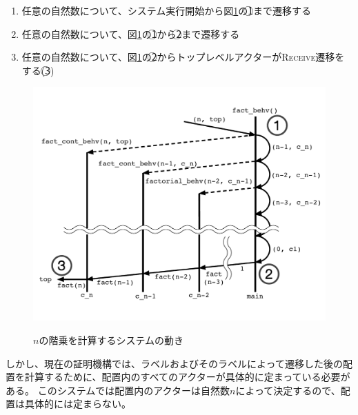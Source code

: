 
\begin{enumerate}
\item 任意の自然数について、システム実行開始から図\ref{img:conclusion:fact}の\textcircled{\scriptsize 1}まで遷移する
\item 任意の自然数について、図\ref{img:conclusion:fact}の\textcircled{\scriptsize 1}から\textcircled{\scriptsize 2}まで遷移する
\item 任意の自然数について、図\ref{img:conclusion:fact}の\textcircled{\scriptsize 2}からトップレベルアクターが\textsc{Receive}遷移をする(\textcircled{\scriptsize 3})
\end{enumerate}

\begin{figure}[tp]
  \centering
  \includegraphics[width=16cm]{./img/conclusion/fact_n.pdf}
  \label{img:conclusion:fact}
  \caption{$n$の階乗を計算するシステムの動き}
\end{figure}

しかし、現在の証明機構では、ラベルおよびそのラベルによって遷移した後の配置を計算するために、配置内のすべてのアクターが具体的に定まっている必要がある。
このシステムでは配置内のアクターは自然数$n$によって決定するので、配置は具体的には定まらない。


